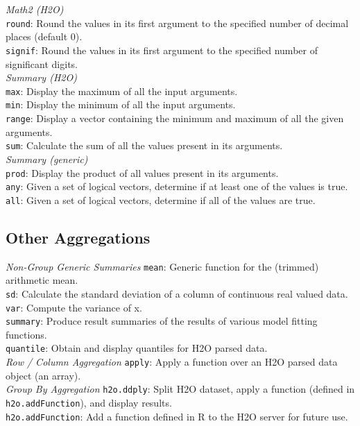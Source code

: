 \documentclass[11pt]{article}
\begin{document}
{\emph{Math2 (H2O)}\\
{\texttt{round}}: Round the values in its first argument to the specified number of decimal places (default 0). \\
{\texttt{signif}}: Round the values in its first argument to the specified number of significant digits.\\

\emph{Summary (H2O)}\\
{\texttt{max}}: Display the maximum of all the input arguments. \\
{\texttt{min}}: Display the minimum of all the input arguments. \\
{\texttt{range}}: Display a vector containing the minimum and maximum of all the given arguments. \\
{\texttt{sum}}: Calculate the sum of all the values present in its arguments.\\

\emph{Summary (generic)}\\
{\texttt{prod}}: Display the product of all values present in its arguments. \\
{\texttt{any}}: Given a set of logical vectors, determine if at least one of the values is true. \\
{\texttt{all}}: Given a set of logical vectors, determine if all of the values are true.\\

\subsection{Other Aggregations}

\emph{Non-Group Generic Summaries}
{\texttt{mean}}: Generic function for the (trimmed) arithmetic mean. \\
{\texttt{sd}}: Calculate the standard deviation of a column of continuous real valued data. \\
{\texttt{var}}: Compute the variance of x.\\
{\texttt{summary}}: Produce result summaries of the results of various model fitting functions. \\
{\texttt{quantile}}: Obtain and display quantiles for H2O parsed data.\\

\emph{Row / Column Aggregation}
{\texttt{apply}: Apply a function over an H2O parsed data object (an array).\\

\emph{Group By Aggregation}
{\texttt{h2o.ddply}}: Split H2O dataset, apply a function (defined in {\texttt{h2o.addFunction}}), and display results.\\
{\texttt{h2o.addFunction}}: Add a function defined in R to the H2O server for future use. \\

}}
\end{document}
